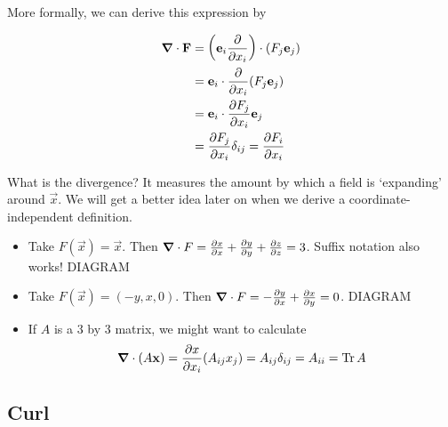 \documentclass{../template/note}
\begin{document}
    More formally, we can derive this expression by

    \begin{align*}
        \div \vec F &= \left(\vec e_i \pd{}{x_i}\right) \cdot (F_j \vec e_j) \\
        &= \vec e_i \cdot \pd{}{x_i}(F_j \vec e_j) \\
        &= \vec e_i \cdot \pd{F_j}{x_i} \vec e_j \\
        &= \pd{F_j}{x_i} \delta_{ij} = \pd{F_i}{x_i}
    \end{align*}
    
    What is the divergence? It measures the amount by which a field is `expanding' around \(\vec x\). We will get a better idea later on when we derive a coordinate-independent definition.

    \begin{example*}
        \begin{itemize}
            \item Take \(F(\vec x) = \vec x\). Then \(\div F = \pd{x}{x} + \pd{y}{y} + \pd{z}{z} = 3\). Suffix notation also works! DIAGRAM
            \item Take \(F(\vec x) = (-y, x, 0)\). Then \(\div F = -\pd{y}{x} + \pd{x}{y} = 0\). DIAGRAM
            \item If \(A\) is a 3 by 3 matrix, we might want to calculate
            \begin{align*}
                \div (A \vec x) = \pd{x}{x_i} (A_{ij}x_j) = A_{ij} \delta_{ij} = A_{ii} = \Tr A
            \end{align*}
        \end{itemize}
    \end{example*}
    
    \subsection{Curl}
\end{document}

